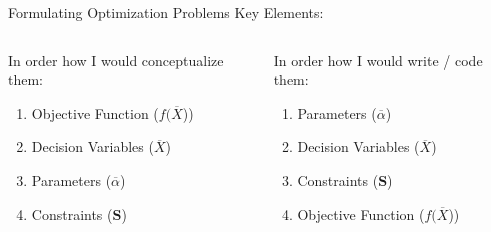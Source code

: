 \documentclass[10pt, aspectratio=169]{beamer}
\begin{document}
\begin{frame}{Formulating Optimization Problems}
    Key Elements:
    \vspace{0.5cm}
    \begin{columns}[t]
        \begin{column}[t]{0.5\textwidth}
            In order how I would conceptualize them:
            \begin{enumerate}
                \item Objective Function ($f(\overline{X}$))
                \item Decision Variables ($\overline{X}$)
                \item Parameters ($\overline{\alpha}$)
                \item Constraints ($\textbf{S}$)
            \end{enumerate}
        \end{column}
        \begin{column}[t]{0.5\textwidth}
            In order how I would write / code them:
            \begin{enumerate}
                \item Parameters ($\overline{\alpha}$)
                \item Decision Variables ($\overline{X}$)
                \item Constraints ($\textbf{S}$)
                \item Objective Function ($f(\overline{X}$))
            \end{enumerate}
        \end{column}
    \end{columns}
\end{frame}
\end{document}
